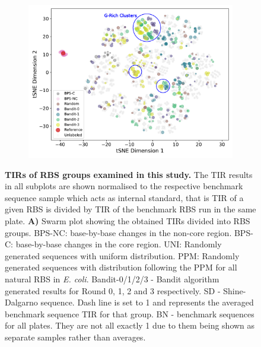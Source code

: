 \documentclass{article}
\begin{document}
\begin{figure}[!ht]
\begin{subfigure}[b]{0.48\textwidth}
    \end{subfigure}
    \begin{subfigure}[b]{0.48\textwidth}
        \centering
        \caption{}
        \includegraphics[scale=0.42]{plots/Main_Paper/tsneplot.pdf}
    \end{subfigure}
    \caption{
    \textbf{TIRs of RBS groups examined in this study.} 
    The TIR results in all subplots are shown normalised to the respective benchmark sequence sample which acts as internal standard, that is TIR of a given RBS is divided by TIR of the benchmark RBS run in the same plate. 
    \textbf{A)} Swarm plot showing the obtained TIRs divided into RBS groups.
    BPS-NC: base-by-base changes in the non-core region. 
    BPS-C: base-by-base changes in the core region. 
    UNI: Randomly generated sequences with uniform distribution. 
    PPM: Randomly generated sequences with distribution following the PPM for all natural RBS in \emph{E. coli}. 
    Bandit-0/1/2/3 - Bandit algorithm generated results for Round 0, 1, 2 and 3 respectively.
    SD - Shine-Dalgarno sequence.
    Dash line is set to 1 and represents the averaged benchmark sequence TIR for that group. 
    BN - benchmark sequences for all plates. 
    They are not all exactly 1 due to them being shown as separate samples rather than averages.
}
\end{figure}
\end{document}
